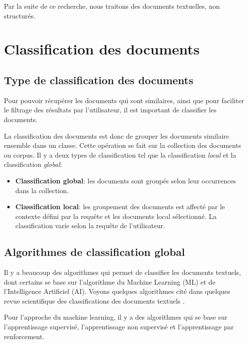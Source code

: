 Par la suite de ce recherche, nous traitons des documents textuelles, non structurés.

\section{Classification des documents}
\subsection{Type de classification des documents}
Pour pouvoir récupérer les documents qui sont similaires, ainsi que pour faciliter le filtrage des résultats par l'utilisateur, il est important de classifier les documents.

La classification des documents est donc de grouper les documents similaire ensemble dans un classe. Cette opération se fait sur la collection des documents ou corpus. Il y a deux types de classification \citep*{modern-ir} tel que la classification \textit{local} et la classification \textit{global}:
\begin{itemize}
    \item \textbf{Classification global}: les documents sont groupés selon leur occurrences dans la collection.
    \item \textbf{Classification local}: les groupement des documents est affecté par le contexte défini par la requête et les documents local sélectionné. La classification varie selon la requête de l'utilisateur.
\end{itemize}

\subsection{Algorithmes de classification global}
Il y a beaucoup des algorithmes qui permet de classifier les documents textuels, dont certains se base sur l'algorithme du Machine Learning (ML) et de l'Intelligence Artificiel (AI). Voyons quelques algorithmes cité dans quelques revue scientifique des classifications des documents textuels \citep*{classification-text-documents,classification-text-documents-ml}.

Pour l'approche du machine learning, il y a des algorithmes qui se base sur l'apprentissage supervisé, l'apprentissage non supervisé et l'apprentissage par renforcement.

